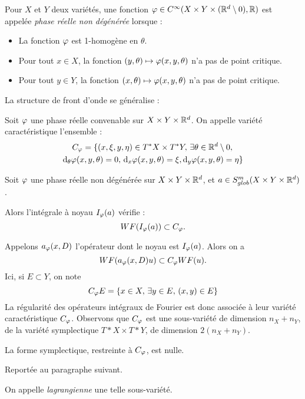 \begin{defn}
  Pour $X$ et $Y$ deux variétés, une fonction $\varphi \in C^{\infty}(X \times Y \times (\mathbb{R}^d\setminus 0),\mathbb{R})$ est appelée \emph{phase réelle non dégénérée} lorsque :
  \begin{itemize}
    \item La fonction $\varphi$ est 1-homogène en $\theta$.
    \item Pour tout $x\in X$, la fonction $(y,\theta)\mapsto \varphi(x,y,\theta)$ n'a pas de point critique.
    \item Pour tout $y\in Y$, la fonction $(x,\theta)\mapsto \varphi(x,y,\theta)$ n'a pas de point critique.
  \end{itemize}
\end{defn}

La structure de front d'onde se généralise :

\begin{defn}Soit $\varphi$ une phase réelle convenable sur $X\times Y\times \mathbb{R}^d$. On appelle variété caractéristique l'ensemble :
\begin{multline*}
    C_{\varphi}=\{(x,\xi,y,\eta) \in T^*X \times T^*Y,\,\exists \theta\in \mathbb{R}^d\setminus 0,\,\\\mathrm{d}_{\theta}\varphi(x,y,\theta)=0,\,\mathrm{d}_x\varphi(x,y,\theta)=\xi, \mathrm{d}_y\varphi(x,y,\theta)=\eta\}
\end{multline*}  
\end{defn}

\begin{prop}
  Soit $\varphi$ une phase réelle non dégénérée sur $X\times Y\times \mathbb{R}^d$, et $a \in S^m_{glob}(X\times Y\times \mathbb{R}^d)$. 

  Alors l'intégrale à noyau $I_{\varphi}(a)$ vérifie :
  \begin{equation*}
    WF(I_{\varphi}(a)) \subset C_{\varphi}.
  \end{equation*}
\end{prop}
Appelons $a_{\varphi}(x,D)$ l'opérateur dont le noyau est $I_{\varphi}(a)$. Alors on a 
  \begin{equation*}
    WF(a_{\varphi}(x,D)u) \subset C_{\varphi}WF(u).
  \end{equation*}
Ici, si $E \subset Y$, on note
\begin{equation*}
  C_{\varphi}E=\{x \in X,\,\exists y \in E,\,(x,y)\in E\}
\end{equation*}
La régularité des opérateurs intégraux de Fourier est donc associée à leur variété caractéristique $C_{\varphi}$. Observons que $C_{\varphi}$ est une sous-variété de dimension $n_X+n_Y$, de la variété symplectique $T*X\times T*Y$, de dimension $2(n_X+n_Y)$. 
\begin{lem}
La forme symplectique, restreinte à $C_{\varphi}$, est nulle.
\end{lem}
\begin{preuve}
Reportée au paragraphe suivant.
\end{preuve}
On appelle \emph{lagrangienne} une telle sous-variété.
